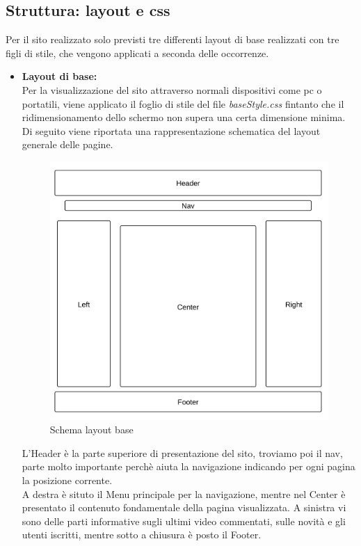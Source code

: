 \subsection{Struttura: layout e css}
Per il sito realizzato solo previsti tre differenti layout di base realizzati con tre figli di stile, che vengono applicati a seconda delle occorrenze.

\begin{itemize}

\item \textbf{Layout di base:}\\
Per la visualizzazione del sito attraverso normali dispositivi come pc o portatili, viene applicato il foglio di stile del file \textit{baseStyle.css} fintanto che il ridimensionamento dello schermo non supera una certa dimensione minima.\\
Di seguito viene riportata una rappresentazione schematica del layout generale delle pagine.

\begin{center}
\begin{figure}[H]
\centering
\includegraphics[scale=0.6]{images/baseLayout.png}
\caption{Schema layout base}
\end{figure}
\end{center}

L'Header è la parte superiore di presentazione del sito, troviamo poi il nav, parte molto importante perchè aiuta la navigazione indicando per ogni pagina la posizione corrente.\\
A destra è situto il Menu principale per la navigazione, mentre nel Center è presentato il contenuto fondamentale della pagina visualizzata. A sinistra vi sono delle parti informative sugli ultimi video commentati, sulle novità e gli utenti iscritti, mentre sotto a chiusura è posto il Footer.



\end{itemize}
